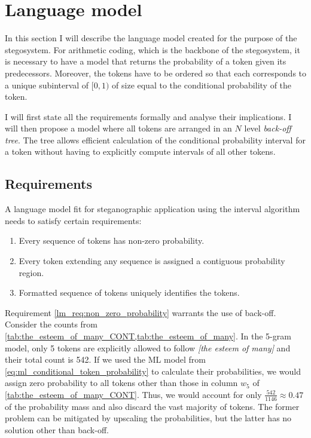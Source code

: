 \documentclass[draft]{IIBproject}
\DeclareRobustCommand{\ngram}[1]{\emph{[#1]}}
\begin{document}
\clearpage
\section{Language model}
\label{sec:language_model}

In this section I will describe the language model created for the purpose of the stegosystem. For arithmetic coding, which is the backbone of the stegosystem, it is necessary to have a model that returns the probability of a token given its predecessors. Moreover, the tokens have to be ordered so that each corresponds to a unique subinterval of $[0,1)$ of size equal to the conditional probability of the token.

I will first state all the requirements formally and analyse their implications. I will then propose a model where all tokens are arranged in an $N$ level \emph{back-off tree}. The tree allows efficient calculation of the conditional probability interval for a token without having to explicitly compute intervals of all other tokens.

\FloatBarrier
\subsection{Requirements}
\label{eq:lm_requirements}

A language model fit for steganographic application using the interval algorithm needs to satisfy certain requirements:

\begin{enumerate}
  \item \label{lm_req:non_zero_probability} Every sequence of tokens has non-zero probability.
  \item \label{lm_req:contiguous_probability} Every token extending any sequence is assigned a contiguous probability region.
  \item \label{lm_req:hidden_symbols} Formatted sequence of tokens uniquely identifies the tokens.
\end{enumerate}

Requirement \ref{lm_req:non_zero_probability} warrants the use of back-off. Consider the counts from \cref{tab:the_esteem_of_many_CONT,tab:the_esteem_of_many}. In the 5-gram model, only 5 tokens are explicitly allowed to follow \ngram{the esteem of many} and their total count is 542. If we used the ML model from \cref{eq:ml_conditional_token_probability} to calculate their probabilities, we would assign zero probability to all tokens other than those in column $w_5$ of \cref{tab:the_esteem_of_many_CONT}. Thus, we would account for only $\frac {542} {1146} \approx 0.47$ of the probability mass and also discard the vast majority of tokens. The former problem can be mitigated by upscaling the probabilities, but the latter has no solution other than back-off.
\end{document}
